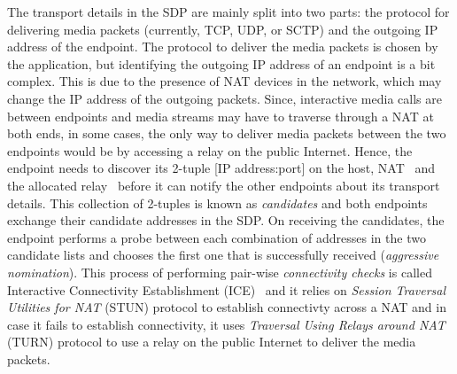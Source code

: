 The transport details in the SDP are mainly split into two parts: the protocol
for delivering media packets (currently, TCP, UDP, or SCTP) and the outgoing
IP address of the endpoint. The protocol to deliver the media packets is
chosen by the application, but identifying the outgoing IP address of an
endpoint is a bit complex. This is due to the presence of NAT devices in the
network, which may change the IP address of the outgoing packets. Since,
interactive media calls are between endpoints and media streams may have to
traverse through a NAT at both ends, in some cases, the only way to deliver
media packets between the two endpoints would be by accessing a relay on the
public Internet. Hence, the endpoint needs to discover its 2-tuple [IP
address:port] on the host, NAT~\cite{rfc5389} and the allocated
relay~\cite{rfc5766} before it can notify the other endpoints about its
transport details. This collection of 2-tuples is known as \emph{candidates}
and both endpoints exchange their candidate addresses in the SDP. On receiving
the candidates, the endpoint performs a probe between each combination of
addresses in the two candidate lists and chooses the first one that is
successfully received (\emph{aggressive nomination}). This process of
performing pair-wise \emph{connectivity checks} is called Interactive
Connectivity Establishment (ICE)~\cite{rfc5245} and it relies on \emph{Session
Traversal Utilities for NAT} (STUN) protocol to establish connectivty across a
NAT and in case it fails to establish connectivity, it uses \emph{Traversal
Using Relays around NAT} (TURN) protocol to use a relay on the public Internet
to deliver the media packets.

